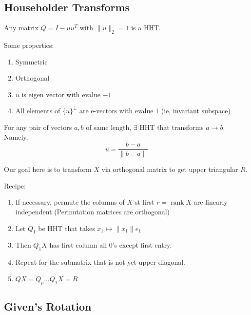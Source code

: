 \documentclass{article}
\newcommand{\rank}{\operatorname{rank}}
\begin{document}
\subsection{Householder Transforms}
\begin{definition}
    Any matrix $Q = I - uu^T$ with $\|u\|_2 = 1$ is a HHT.
\end{definition}
\begin{fact}
Some properties:
    \begin{enumerate}
        \item Symmetric
        \item Orthogonal
        \item $u$ is eigen vector with evalue $-1$
        \item All elements of $\{u\}^\perp$ are e-vectors with evalue $1$ (ie, invariant subspace)
    \end{enumerate}
\end{fact}
\begin{fact}
    For any pair of vectors $a,b$ of same length, $\exists$ HHT that transforms $a\to b$. Namely,
    $$u = \frac{b-a}{\|b-a\|}$$
\end{fact}
Our goal here is to transform $X$ via orthogonal matrix to get upper triangular $R$. \\ 
\begin{fact}
    Recipe:
    \begin{enumerate}
    \item If necessary, permute the columns of $X$ st first $r = \rank X$ are linearly independent (Permutation matrices are orthogonal)
        \item Let $Q_1$ be HHT that takes $x_1 \mapsto \|x_1\|e_1$
        \item Then $Q_1 X$ has first column all 0's except first entry. 
        \item Repeat for the submatrix that is not yet upper diagonal. 
        \item $QX = Q_p \ldots Q_1 X = R$
    \end{enumerate}
\end{fact}
\subsection{Given's Rotation}
\end{document}
